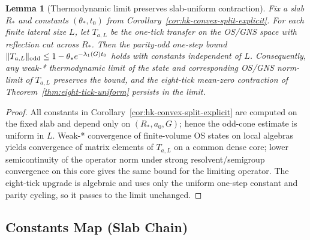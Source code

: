 \documentclass[11pt]{amsart}
\theoremstyle{plain}
\newtheorem{lemma}[theorem]{Lemma}
\theoremstyle{definition}
\theoremstyle{remark}
\begin{document}
\begin{lemma}[Thermodynamic limit preserves slab-uniform contraction]\label{lem:thermo-preserve-gap}
Fix a slab $R_*$ and constants $(\theta_*,t_0)$ from Corollary~\ref{cor:hk-convex-split-explicit}. For each finite lateral size $L$, let $T_{a,L}$ be the one-tick transfer on the OS/GNS space with reflection cut across $R_*$. Then the parity-odd one-step bound $\|T_{a,L}\|_{\rm odd}\le 1-\theta_* e^{-\lambda_1(G) t_0}$ holds with constants independent of $L$. Consequently, any weak-* thermodynamic limit of the state and corresponding OS/GNS norm-limit of $T_{a,L}$ preserves the bound, and the eight-tick mean-zero contraction of Theorem~\ref{thm:eight-tick-uniform} persists in the limit.
\end{lemma}
\begin{proof}
All constants in Corollary~\ref{cor:hk-convex-split-explicit} are computed on the fixed slab and depend only on $(R_*,a_0,G)$; hence the odd-cone estimate is uniform in $L$. Weak-* convergence of finite-volume OS states on local algebras yields convergence of matrix elements of $T_{a,L}$ on a common dense core; lower semicontinuity of the operator norm under strong resolvent/semigroup convergence on this core gives the same bound for the limiting operator. The eight-tick upgrade is algebraic and uses only the uniform one-step constant and parity cycling, so it passes to the limit unchanged.
\end{proof}

\subsection*{Constants Map (Slab Chain)}
\label{subsec:constants-map-slab}
\end{document}

